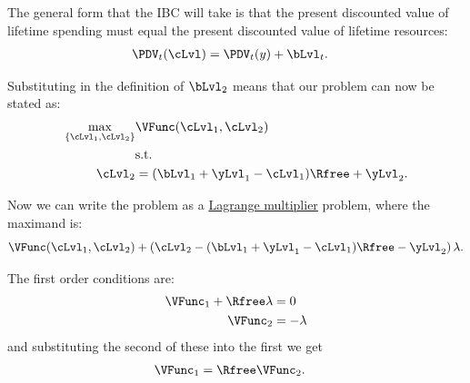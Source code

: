 \documentclass{scrartcl}
\begin{document}
  The general form that the IBC will take is that the present discounted value of lifetime spending must equal the present discounted value of lifetime resources:
  \begin{equation}\begin{gathered}\begin{aligned} \PDV_{t}(\cLvl) & = \PDV_{t}(y)+\bLvl_{t}. \label{eq:ibcgen}
      \end{aligned}\end{gathered}\end{equation}

  Substituting in the definition of $\bLvl_{2}$ means that our problem can now be stated as:
  \begin{equation}\begin{gathered}\begin{aligned} \max_{\{\cLvl_{1},\cLvl_{2}\}} & \VFunc(\cLvl_{1},\cLvl_{2}) \\ & \mbox{s.t.}  \nonumber \\ \cLvl_{2} & = (\bLvl_{1}+\yLvl_{1}-\cLvl_{1})\Rfree+\yLvl_{2}.
      \end{aligned}\end{gathered}\end{equation}

  Now we can write the problem as a \href{https://en.wikipedia.org/wiki/Lagrange_multiplier}{Lagrange multiplier} problem, where the maximand is:
  \begin{equation} \VFunc(\cLvl_{1},\cLvl_{2}) + \left( \cLvl_{2}- (\bLvl_{1}+\yLvl_{1}-\cLvl_{1})\Rfree-\yLvl_{2}\right)\lambda.
  \end{equation}

  The first order conditions are:
  \begin{equation}\begin{gathered}\begin{aligned} \VFunc_{1} + \Rfree\lambda & = 0 \label{eq:lagrange1} \\ \VFunc_{2} & = -\lambda
      \end{aligned}\end{gathered}\end{equation} and substituting the second of these into the first we get
  \begin{equation}\begin{gathered}\begin{aligned} \VFunc_{1} & = \Rfree \VFunc_{2} \label{eq:timeprice}.
      \end{aligned}\end{gathered}\end{equation}
\end{document}
